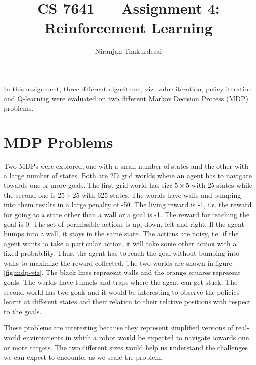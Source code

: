 \documentclass[letterpaper]{article}
\title{CS 7641 --- Assignment 4: Reinforcement Learning}
\author{Niranjan Thakurdesai}
\begin{document}
	\maketitle
	
	In this assignment, three different algorithms, viz. value iteration, policy iteration and Q-learning were evaluated on two different Markov Decision Process (MDP) problems.
	
	\section{MDP Problems}
	Two MDPs were explored, one with a small number of states and the other with a large number of states. Both are 2D grid worlds where an agent has to navigate towards one or more goals. The first grid world has size $5 \times 5$ with 25 states while the second one is $25 \times 25$ with 625 states. The worlds have walls and bumping into them results in a large penalty of -50. The living reward is -1, i.e. the reward for going to a state other than a wall or a goal is -1. The reward for reaching the goal is 0. The set of permissible actions is up, down, left and right. If the agent bumps into a wall, it stays in the same state. The actions are noisy, i.e. if the agent wants to take a particular action, it will take some other action with a fixed probability. Thus, the agent has to reach the goal without bumping into walls to maximize the reward collected. The two worlds are shown in figure \ref{fig:mdp-viz}. The black lines represent walls and the orange squares represent goals. The worlds have tunnels and traps where the agent can get stuck. The second world has two goals and it would be interesting to observe the policies learnt at different states and their relation to their relative positions with respect to the goals.
	
	These problems are interesting because they represent simplified versions of real-world environments in which a robot would be expected to navigate towards one or more targets. The two different sizes would help us understand the challenges we can expect to encounter as we scale the problem.
	
\end{document}
